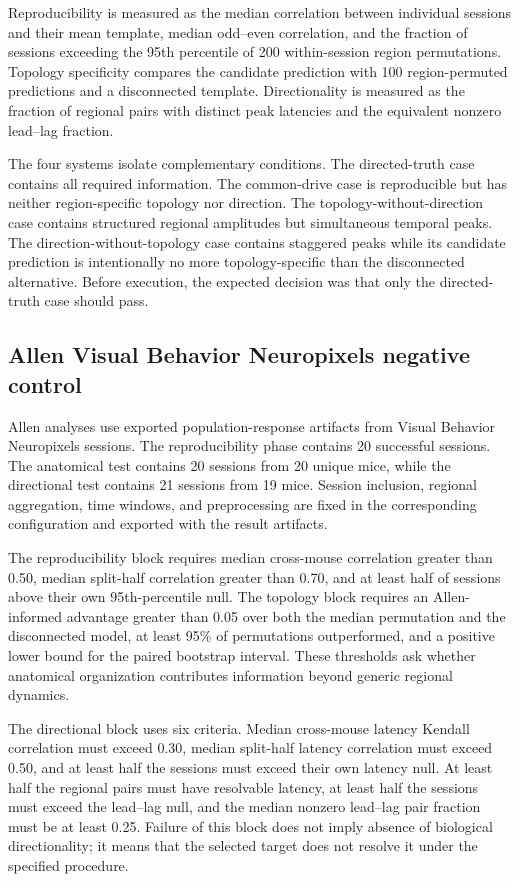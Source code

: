 Reproducibility is measured as the median correlation between individual
sessions and their mean template, median odd--even correlation, and the fraction
of sessions exceeding the 95th percentile of 200 within-session region
permutations. Topology specificity compares the candidate prediction with 100
region-permuted predictions and a disconnected template. Directionality is
measured as the fraction of regional pairs with distinct peak latencies and the
equivalent nonzero lead--lag fraction.

The four systems isolate complementary conditions. The directed-truth case
contains all required information. The common-drive case is reproducible but has
neither region-specific topology nor direction. The topology-without-direction
case contains structured regional amplitudes but simultaneous temporal peaks.
The direction-without-topology case contains staggered peaks while its candidate
prediction is intentionally no more topology-specific than the disconnected
alternative. Before execution, the expected decision was that only the
directed-truth case should pass.

\subsection{Allen Visual Behavior Neuropixels negative control}

Allen analyses use exported population-response artifacts from Visual Behavior
Neuropixels sessions. The reproducibility phase contains 20 successful sessions.
The anatomical test contains 20 sessions from 20 unique mice, while the
directional test contains 21 sessions from 19 mice. Session inclusion, regional
aggregation, time windows, and preprocessing are fixed in the corresponding
configuration and exported with the result artifacts.

The reproducibility block requires median cross-mouse correlation greater than
0.50, median split-half correlation greater than 0.70, and at least half of
sessions above their own 95th-percentile null. The topology block requires an
Allen-informed advantage greater than 0.05 over both the median permutation and
the disconnected model, at least 95\% of permutations outperformed, and a
positive lower bound for the paired bootstrap interval. These thresholds ask
whether anatomical organization contributes information beyond generic regional
dynamics.

The directional block uses six criteria. Median cross-mouse latency Kendall
correlation must exceed 0.30, median split-half latency correlation must exceed
0.50, and at least half the sessions must exceed their own latency null. At least
half the regional pairs must have resolvable latency, at least half the sessions
must exceed the lead--lag null, and the median nonzero lead--lag pair fraction
must be at least 0.25. Failure of this block does not imply absence of biological
directionality; it means that the selected target does not resolve it under the
specified procedure.

